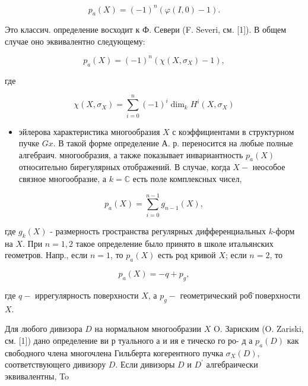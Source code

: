 \documentclass[10pt]{article}
\begin{document}
\[

p_{a}(X)=(-1)^{n}(\varphi(I, 0)-1) .

\]



Это классич. определение восходит к Ф. Севери (F. Severi, см. [1]). В общем случае оно эквивалентно следующему:



\[

p_{a}(X)=(-1)^{n}\left(\chi\left(X, \sigma_{X}\right)-1\right),

\]



где



\[

\chi\left(X, \sigma_{X}\right)=\sum_{i=0}^{n}(-1)^{i} \operatorname{dim}_{k} H^{i}\left(X, \sigma_{X}\right)

\]



\begin{itemize}

  \item эйлерова характеристика многообразия $X$ с коэффициентами в структурном пучке $G x$. В такой форме определение А. р. переносится на любые полные алгебраич. многообразия, а также показывает инвариантность $p_{a}(X)$ относительно бирегулярных отображений. В случае, когда $X-$ неособое связное многообразие, а $k=\mathbb{C}$ есть поле комплексных чисел,

\end{itemize}



\[

p_{a}(X)=\sum_{i=0}^{n-1} g_{n-1}(X),

\]



где $g_{k}(X)$ - размерность гространства регулярных дифференциальных $k$-форм на $X$. При $n=1,2$ такое определение было принято в школе итальянских геометров. Напр., если $n=1$, то $p_{a}(X)$ есть род кривой $X$; если $n=2$, то



\[

p_{a}(X)=-q+p_{g},

\]



где $q-$ иррегулярность поверхности $X$, а $p_{g}-$ геометрический роб̈ поверхности $X$.



Для любого дивизора $D$ на нормальном многообразии $X$ O. Зариским (O. Zariski, см. [1]) дано определение ви р туального а и ия е тическо го ро- д а $p_{a}(D)$ как свободного члена многочлена Гильберта когерентного пучка $\sigma_{X}(D)$, соответствующего дивизору $D$. Если дивизоры $D$ и $D^{\prime}$ алгебраически эквивалентны, To
\end{document}
